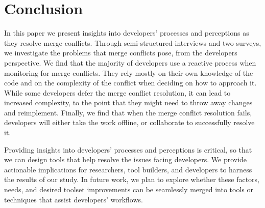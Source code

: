 \section{Conclusion}\label{conclusion}

In this paper we present insights into developers' processes and perceptions as they resolve merge conflicts.
Through semi-structured interviews and two surveys, we investigate the problems that merge conflicts pose, from the developers perspective.
We find that the majority of developers use a reactive process when monitoring for merge conflicts.
They rely mostly on their own knowledge of the code and on the complexity of the conflict when deciding on how to approach it.
While some developers defer the merge conflict resolution, it can lead to increased complexity, to the point that they might need to throw away changes and reimplement.
Finally, we find that when the merge conflict resolution fails, developers will either take the work offline, or collaborate to successfully resolve it. 

Providing insights into developers' processes and perceptions is critical, so that we can design tools that help resolve the issues facing developers.
We provide actionable implications for researchers, tool builders, and developers to harness the results of our study.
In future work, we plan to explore whether these factors, needs, and desired toolset improvements can be seamlessly merged into tools or techniques that assist developers' workflows.

%
%
